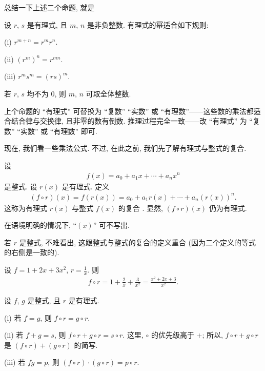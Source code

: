总结一下上述二个命题, 就是
\begin{proposition}
    设 $r$, $s$ 是有理式, 且 $m$, $n$ 是非负整数. 有理式的幂适合如下规则:

    (i) $r^{m+n} = r^m r^n$.

    (ii) $(r^m)^n = r^{mn}$.

    (iii) $r^m s^m = (rs)^m$.

    若 $r$, $s$ 均不为 $0$, 则 $m$, $n$ 可取全体整数.
\end{proposition}

\begin{remark}
    上个命题的 ``有理式'' 可替换为 ``复数'' ``实数'' 或 ``有理数''——这些数的乘法都适合结合律与交换律, 且非零的数有倒数. 推理过程完全一致——改 ``有理式'' 为 ``复数'' ``实数'' 或 ``有理数'' 即可.
\end{remark}

现在, 我们看一些乘法公式. 不过, 在此之前, 我们先了解有理式与整式的复合.

\begin{definition}
    设
    \begin{align*}
        f(x) = a_0 + a_1 x + \cdots + a_n x^n
    \end{align*}
    是整式. 设 $r(x)$ 是有理式. 定义
    \begin{align*}
        (f \circ r)(x) = f(r(x)) = a_0 + a_1 r(x) + \cdots + a_n (r(x))^n.
    \end{align*}
    这称为有理式 $r(x)$ 与整式 $f(x)$ 的复合 . 显然, $(f \circ r)(x)$ 仍为有理式.

    在语境明确的情况下, ``$(x)$'' 可不写出.
\end{definition}

\begin{remark}
    若 $r$ 是整式, 不难看出, 这跟整式与整式的复合的定义重合 (因为二个定义的等式的右侧是一致的).
\end{remark}

\begin{example}
    设 $f = 1 + 2x + 3x^2$, $r = \frac{1}{x}$. 则
    \begin{align*}
        f \circ r = 1 + \frac{2}{x} + \frac{3}{x^2} = \frac{x^2 + 2x + 3}{x^2}.
    \end{align*}
\end{example}

\begin{proposition}
    设 $f$, $g$ 是整式, 且 $r$ 是有理式.

    (i) 若 $f = g$, 则 $f \circ r = g \circ r$.

    (ii) 若 $f + g = s$, 则 $f \circ r + g \circ r = s \circ r$. 这里, $\circ$ 的优先级高于 $+$; 所以, $f \circ r + g \circ r$ 是 $(f \circ r) + (g \circ r)$ 的简写.

    (iii) 若 $fg = p$, 则 $(f \circ r) \cdot (g \circ r) = p \circ r$.
\end{proposition}

